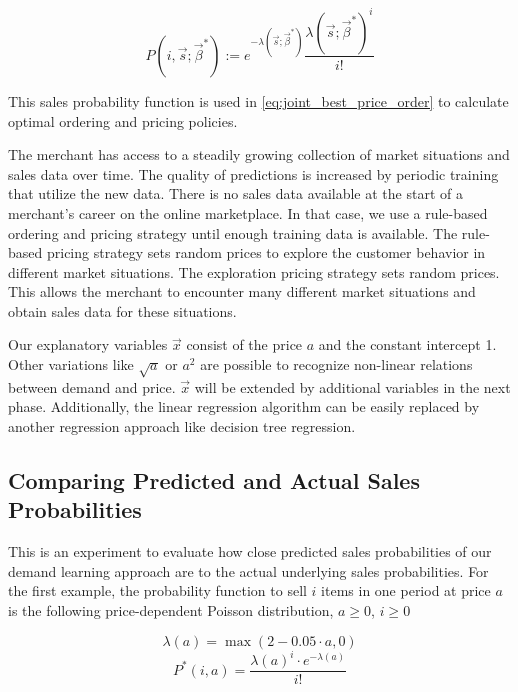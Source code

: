 \begin{equation}
\label{eq:probability}
P(i, \vec{s}; \vec{\beta}^*) :=
	e^{-\lambda(\vec{s}; \vec{\beta}^*)}
	\frac{\lambda(\vec{s}; \vec{\beta}^*)^{i}}{i!}
\end{equation}

This sales probability function is used in \cref{eq:joint_best_price_order} to calculate optimal ordering and pricing policies.

The merchant has access to a steadily growing collection of market situations and sales data over time.
The quality of predictions is increased by periodic training that utilize the new data.
There is no sales data available at the start of a merchant's career on the online marketplace.
In that case, we use a rule-based ordering and pricing strategy until enough training data is available.
The rule-based pricing strategy sets random prices to explore the customer behavior in different market situations.
The exploration pricing strategy sets random prices.
This allows the merchant to encounter many different market situations and obtain sales data for these situations.

Our explanatory variables $\vec{x}$ consist of the price $a$ and the constant intercept 1.
Other variations like $\sqrt{a}$ or $a^2$ are possible to recognize non-linear relations between demand and price.
$\vec{x}$ will be extended by additional variables in the next phase.
Additionally, the linear regression algorithm can be easily replaced by another regression approach like decision tree regression.

\subsection{Comparing Predicted and Actual Sales Probabilities}
\label{section:prediction_quality}

This is an experiment to evaluate how close predicted sales probabilities of our demand learning approach are to the actual underlying sales probabilities.
For the first example, the probability function to sell $i$ items in one period at price $a$ is the following price-dependent Poisson distribution, $a \geq 0$, $i \geq 0$

\begin{equation}
\lambda(a) = \max(2 - 0.05 \cdot a, 0)
\end{equation}
\begin{equation}
P^*(i, a) = \frac{\lambda(a)^i \cdot e^{-\lambda(a)}}{i!}
\end{equation}

